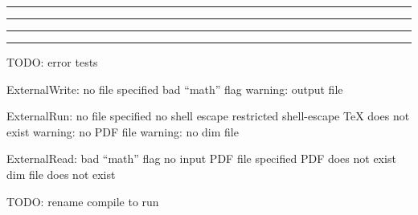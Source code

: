 \documentclass[10pt]{ltxdoc}
\newcommand{\showfile}[1]{
  \begin{tcolorbox}[title=\texttt{#1}]
  
  \end{tcolorbox}
}
\def\gauge{%
  \rule{0.2em}{7pt}%
  \llap{\rule[8pt]{0.2em}{2pt}}%
}
\begin{document}
\showfile{example-standalone-catcode.tex}

\begin{tcblisting}{}
\gauge\ExternalRun[file=example-standalone-catcode]\gauge

\gauge\ExternalRead[file=example-standalone-catcode]\gauge
\end{tcblisting}

TODO: error tests

ExternalWrite:
  no file specified
  bad ``math'' flag
  warning: output file

ExternalRun:
  no file specified
  no shell escape
  restricted shell-escape
  TeX does not exist
  warning: no PDF file
  warning: no dim file

ExternalRead:
  bad ``math'' flag
  no input PDF file specified
  PDF does not exist
  dim file does not exist

TODO: rename compile to run
\end{document}
